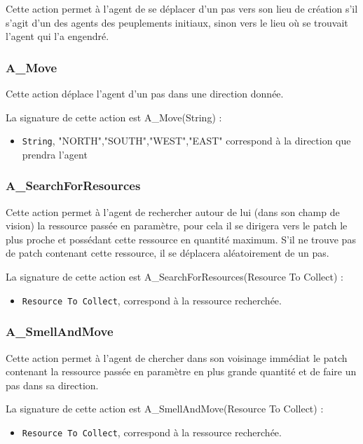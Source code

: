 	Cette action permet à l'agent de se déplacer d'un pas vers son lieu de création s'il s'agit d'un des agents des peuplements initiaux, sinon vers le lieu où se trouvait l'agent qui l'a engendré.
	
	\subsubsection{A\_Move}
	
	Cette action déplace l'agent d'un pas dans une direction donnée.
	
	 La signature de cette action est A\_Move(String) :
	
	\begin{itemize}
	\item \texttt{String}, "NORTH","SOUTH","WEST","EAST" correspond à la direction que prendra  l'agent
	\end{itemize}
	
	\subsubsection{A\_SearchForResources} 
	
	Cette action permet à l'agent de rechercher autour de lui (dans son champ de vision)  la ressource passée en paramètre,  pour cela il se dirigera vers le patch le plus proche et  possédant cette ressource en quantité maximum. S'il ne trouve pas de patch contenant cette ressource, il se déplacera aléatoirement de un pas.
	
	 La signature de cette action est A\_SearchForResources(Resource To Collect) :
	
	\begin{itemize}
	\item \texttt{Resource To Collect}, correspond à la ressource recherchée.
	\end{itemize}
	
	\subsubsection{A\_SmellAndMove}
	
	Cette action permet à l'agent de chercher dans son voisinage immédiat le patch contenant la ressource passée en paramètre en plus grande quantité et de faire un pas dans sa direction. 
	
	La signature de cette action est A\_SmellAndMove(Resource To Collect) :
	
	\begin{itemize}
	\item \texttt{Resource To Collect}, correspond à la ressource recherchée.
	\end{itemize}
	
